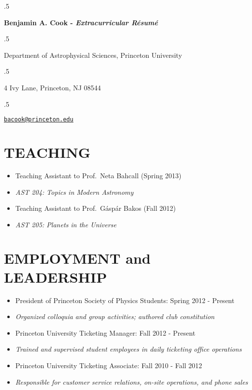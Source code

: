 \documentclass[margin]{res}
\newcommand\mancenter[1]{\moveleft.5\hoffset\centerline{#1}}
\begin{document}
  
\moveleft.5\hoffset\centerline{\huge \bf{Benjamin A. Cook} -
  \textit{Extracurricular R\'esum\'e}} \mancenter{\large Department of
  Astrophysical Sciences, Princeton University} \mancenter{\large 4
  Ivy Lane, Princeton, NJ 08544}
\mancenter{\large\tt\href{mailto:bacook@princeton.edu}{bacook@princeton.edu}}
\begin{resume}                        
 

\section{TEACHING}
\begin{itemize}
\item Teaching Assistant to Prof.~Neta Bahcall (Spring 2013)
\item[] \textit{AST 204: Topics in Modern Astronomy}
\item Teaching Assistant to Prof.~G\'asp\'ar Bakos (Fall 2012)
\item[] \textit{AST 205: Planets in the Universe}
\end{itemize}

\section{EMPLOYMENT and LEADERSHIP}
\begin{itemize} 
                   \item President of Princeton Society of Physics
                     Students: Spring 2012 - Present
                   	\item[] \textit{Organized colloquia and group
                          activities; authored club constitution}
                   \item Princeton University Ticketing Manager: Fall
                     2012 - Present
                    \item[] \textit{Trained and supervised student
                      employees in daily ticketing office operations}
                      \item Princeton University Ticketing Associate:
                        Fall 2010 - Fall 2012
                        \item[] \textit{Responsible for customer
                          service relations, on-site operations, and
                          phone sales}
                   \end{itemize}


\end{resume}
\end{document}
